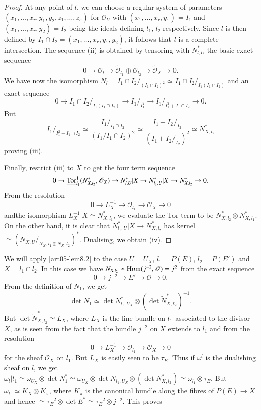 \begin{proof}
At any point of $l$, we can choose a regular system of parameters
$(x_{1},\ldots,x_{r},y_{1},y_{2},z_{1},\ldots,z_{s})$ for
$\mathscr{O}_{U}$ with $(x_{1},\ldots,x_{r},y_{1})=I_{1}$ and
$(x_{1},\ldots,x_{r},y_{2})=I_{2}$ being the ideals defining $l_{1}$,
$l_{2}$ respectively. Since $l$ is then defined by $I_{1}\cap
I_{2}=(x_{1},\ldots,x_{r},y_{1},y_{2})$, it follows that $l$ is a
complete intersection. The sequence (ii) is obtained by tensoring with
$N^{*}_{l,U}$ the basic exact sequence
$$
0\to \mathscr{O}_{l}\to \widetilde{\mathscr{O}}_{l_{1}}\oplus \widetilde{\mathscr{O}}_{l_{2}}\to \widetilde{\mathscr{O}}_{X}\to 0.
$$
We have now the isomorphism $N_{l}=I_{1}\cap I_{2}/_{(I_{1}\cap
I_{2})^{2}}\simeq I_{1}\cap I_{2}/_{I_{1}(I_{1}\cap I_{2})}$ and an
exact sequence
$$
0\to I_{1}\cap I_{2}/_{I_{1}(I_{1}\cap I_{2})}\to
I_{1}/_{I^{2}_{1}}\to I_{1}/_{I^{2}_{1}+I_{1}\cap I_{2}}\to 0.
$$
But
$$
I_{1}/_{I^{2}_{1}+I_{1}\cap I_{2}}\simeq \dfrac{I_{1}/_{I_{1}\cap
I_{2}}}{(I_{1}/I_{1}\cap
I_{2})^{2}}\simeq \dfrac{I_{1}+I_{2}/_{I_{2}}}{(I_{1}+I_{2}/_{I_{2}})^{2}}\simeq N^{*}_{X,l_{2}}
$$
proving (iii).

Finally, restrict (iii) to $X$ to get the four term sequence
$$
0\to \underline{\operatorname{Tor}}^{1}_{l_{1}}(N^{*}_{X,l_{2}},\mathscr{O}_{X})\to
N^{*}_{l,U}|X\to N^{*}_{l_{1},U}|X\to N^{*}_{X,l_{2}}\to 0.
$$
From the resolution
$$
0\to L^{-1}_{X}\to \mathscr{O}_{l_{1}}\to \mathscr{O}_{X}\to 0
$$
and\pageoriginale the isomorphism $L^{-1}_{X}|X\simeq
N^{*}_{X,l_{1}}$, we evaluate the Tor-term to be
$N^{*}_{X,l_{2}}\otimes N^{*}_{X,l_{1}}$. On the other hand, it is
clear that $N^{*}_{l_{1},U}|X\to N^{*}_{X,l_{2}}$ has kernel $\simeq
(N_{X,U}/_{N_{X},l_{1}\otimes N_{X},l_{2}})^{*}$. Dualising, we
obtain (iv).
\end{proof}

We will apply \ref{art05-lem8.2} to the case $U=U_{X}$, $l_{1}=P(E)$,
$l_{2}=P(E')$ and $X=l_{1}\cap l_{2}$. In this case we have
$N_{X,l_{2}}\simeq \operatorname{Hom}(j^{-2},\mathscr{O})=j^{2}$ from the exact
sequence
$$
0\to j^{-2}\to E'\to \mathscr{O}\to 0.
$$
From the definition of $N_{1}$, we get 
$$
\det N_{1}\simeq \det N^{*}_{l_{1},U_{X}}\otimes
(\det \widetilde{N}^{*}_{X,l_{2}})^{-1}. 
$$
But $\det \widetilde{N}^{*}_{X,l_{2}}\simeq L_{X}$, where $L_{X}$ is
the line bundle on $l_{1}$ associated to the divisor $X$, as is seen
from the fact that the bundle $j^{-2}$ on $X$ extends to $l_{1}$ and
from the resolution
$$
0\to L^{-1}_{X}\to \mathscr{O}_{l_{1}}\to \mathscr{O}_{X}\to 0
$$
for the sheaf $\mathscr{O}_{X}$ on $l_{1}$. But $L_{X}$ is easily seen
to be $\tau_{E}$. Thus if $\omega^{l}$ is the dualishing sheaf on $l$,
we get $\omega_{l}|l_{1}\simeq \omega_{U_{X}}\otimes \det
N^{*}_{1}\simeq \omega_{U_{X}}\otimes \det N_{l_{1},U_{X}}\otimes
(\det N^{*}_{X,l_{2}})\simeq \omega_{l_{1}}\otimes \tau_{E}$. But
$\omega_{l_{1}}\simeq K_{X}\otimes K_{\pi}$, where $K_{\pi}$ is the
canonical bundle along the fibres of $P(E)\to X$ and hence
$\simeq \tau^{-2}_{E}\otimes \det E^{*}\simeq \tau^{-2}_{E}\otimes
j^{-2}$. This proves

